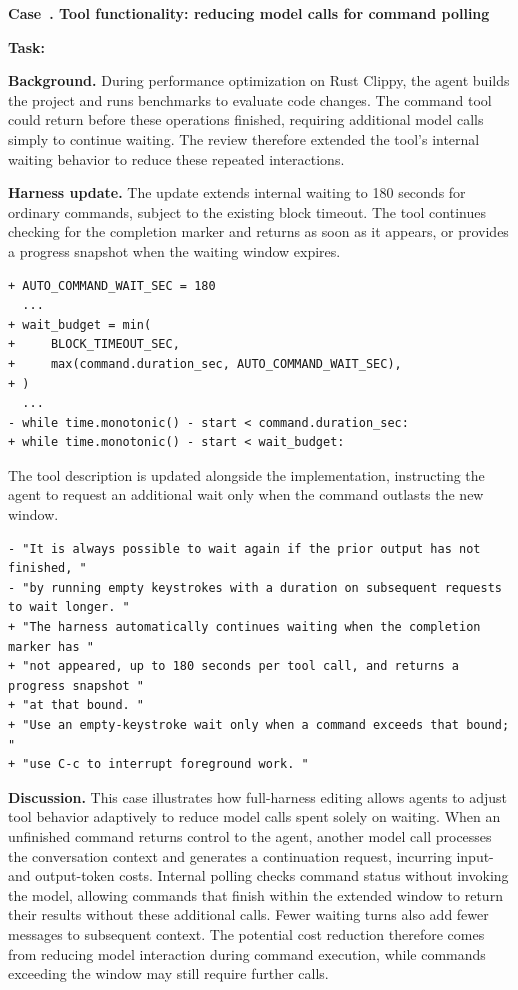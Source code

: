 \par\medskip
{}
\label{case:polling}
\noindent\textbf{Case~\theharnesscase. Tool functionality: reducing model calls for command polling}
\par\nopagebreak

\noindent\textbf{Task:} {\small{}}

\textbf{Background.}
During performance optimization on Rust Clippy, the agent builds the project and runs benchmarks to evaluate code changes. The command tool could return before these operations finished, requiring additional model calls simply to continue waiting. The review therefore extended the tool's internal waiting behavior to reduce these repeated interactions.

\textbf{Harness update.}
The update extends internal waiting to 180 seconds for ordinary commands, subject to the existing block timeout. The tool continues checking for the completion marker and returns as soon as it appears, or provides a progress snapshot when the waiting window expires.

\begin{lstlisting}[linebackgroundcolor={\DiffBackground{1,3,4,5,6,9}{8}}]
+ AUTO_COMMAND_WAIT_SEC = 180
  ...
+ wait_budget = min(
+     BLOCK_TIMEOUT_SEC,
+     max(command.duration_sec, AUTO_COMMAND_WAIT_SEC),
+ )
  ...
- while time.monotonic() - start < command.duration_sec:
+ while time.monotonic() - start < wait_budget:
\end{lstlisting}

The tool description is updated alongside the implementation, instructing the agent to request an additional wait only when the command outlasts the new window.

\begin{lstlisting}[linebackgroundcolor={\DiffBackground{3,4,5,6,7}{1,2}}]
- "It is always possible to wait again if the prior output has not finished, "
- "by running empty keystrokes with a duration on subsequent requests to wait longer. "
+ "The harness automatically continues waiting when the completion marker has "
+ "not appeared, up to 180 seconds per tool call, and returns a progress snapshot "
+ "at that bound. "
+ "Use an empty-keystroke wait only when a command exceeds that bound; "
+ "use C-c to interrupt foreground work. "
\end{lstlisting}

\textbf{Discussion.}
This case illustrates how full-harness editing allows agents to adjust tool behavior adaptively to reduce model calls spent solely on waiting. When an unfinished command returns control to the agent, another model call processes the conversation context and generates a continuation request, incurring input- and output-token costs. Internal polling checks command status without invoking the model, allowing commands that finish within the extended window to return their results without these additional calls. Fewer waiting turns also add fewer messages to subsequent context. The potential cost reduction therefore comes from reducing model interaction during command execution, while commands exceeding the window may still require further calls.

